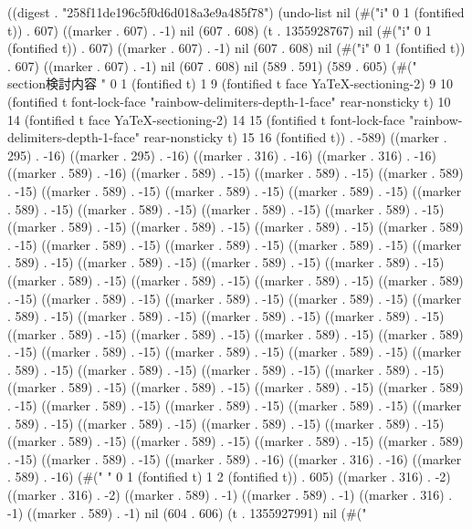 
((digest . "258f11de196c5f0d6d018a3e9a485f78") (undo-list nil (#("i" 0 1 (fontified t)) . 607) ((marker . 607) . -1) nil (607 . 608) (t . 1355928767) nil (#("i" 0 1 (fontified t)) . 607) ((marker . 607) . -1) nil (607 . 608) nil (#("i" 0 1 (fontified t)) . 607) ((marker . 607) . -1) nil (607 . 608) nil (589 . 591) (589 . 605) (#(" \\section{検討内容}
" 0 1 (fontified t) 1 9 (fontified t face YaTeX-sectioning-2) 9 10 (fontified t font-lock-face "rainbow-delimiters-depth-1-face" rear-nonsticky t) 10 14 (fontified t face YaTeX-sectioning-2) 14 15 (fontified t font-lock-face "rainbow-delimiters-depth-1-face" rear-nonsticky t) 15 16 (fontified t)) . -589) ((marker . 295) . -16) ((marker . 295) . -16) ((marker . 316) . -16) ((marker . 316) . -16) ((marker . 589) . -16) ((marker . 589) . -15) ((marker . 589) . -15) ((marker . 589) . -15) ((marker . 589) . -15) ((marker . 589) . -15) ((marker . 589) . -15) ((marker . 589) . -15) ((marker . 589) . -15) ((marker . 589) . -15) ((marker . 589) . -15) ((marker . 589) . -15) ((marker . 589) . -15) ((marker . 589) . -15) ((marker . 589) . -15) ((marker . 589) . -15) ((marker . 589) . -15) ((marker . 589) . -15) ((marker . 589) . -15) ((marker . 589) . -15) ((marker . 589) . -15) ((marker . 589) . -15) ((marker . 589) . -15) ((marker . 589) . -15) ((marker . 589) . -15) ((marker . 589) . -15) ((marker . 589) . -15) ((marker . 589) . -15) ((marker . 589) . -15) ((marker . 589) . -15) ((marker . 589) . -15) ((marker . 589) . -15) ((marker . 589) . -15) ((marker . 589) . -15) ((marker . 589) . -15) ((marker . 589) . -15) ((marker . 589) . -15) ((marker . 589) . -15) ((marker . 589) . -15) ((marker . 589) . -15) ((marker . 589) . -15) ((marker . 589) . -15) ((marker . 589) . -15) ((marker . 589) . -15) ((marker . 589) . -15) ((marker . 589) . -15) ((marker . 589) . -15) ((marker . 589) . -15) ((marker . 589) . -15) ((marker . 589) . -15) ((marker . 589) . -15) ((marker . 589) . -15) ((marker . 589) . -15) ((marker . 589) . -15) ((marker . 589) . -15) ((marker . 589) . -15) ((marker . 589) . -15) ((marker . 589) . -15) ((marker . 589) . -15) ((marker . 589) . -15) ((marker . 589) . -16) ((marker . 316) . -16) ((marker . 589) . -16) (#(" 
" 0 1 (fontified t) 1 2 (fontified t)) . 605) ((marker . 316) . -2) ((marker . 316) . -2) ((marker . 589) . -1) ((marker . 589) . -1) ((marker . 316) . -1) ((marker . 589) . -1) nil (604 . 606) (t . 1355927991) nil (#("
